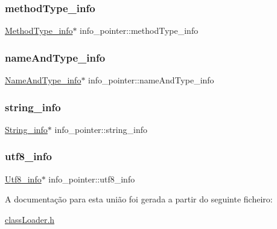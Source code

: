 \subsubsection{\texorpdfstring{method\+Type\+\_\+info}{methodType\_info}}
{\footnotesize\ttfamily \hyperlink{struct_method_type__info}{Method\+Type\+\_\+info}$\ast$ info\+\_\+pointer\+::method\+Type\+\_\+info}

\mbox{\label{unioninfo__pointer_a6fecafb432eea68dd658b66c527b2604}} 
\subsubsection{\texorpdfstring{name\+And\+Type\+\_\+info}{nameAndType\_info}}
{\footnotesize\ttfamily \hyperlink{struct_name_and_type__info}{Name\+And\+Type\+\_\+info}$\ast$ info\+\_\+pointer\+::name\+And\+Type\+\_\+info}

\mbox{\label{unioninfo__pointer_ab42897bc57d173f34b4ffc004dc0c9bf}} 
\subsubsection{\texorpdfstring{string\+\_\+info}{string\_info}}
{\footnotesize\ttfamily \hyperlink{struct_string__info}{String\+\_\+info}$\ast$ info\+\_\+pointer\+::string\+\_\+info}

\mbox{\label{unioninfo__pointer_a7a08700f711c4dbc7cbfeadb6b8fa4c2}} 
\subsubsection{\texorpdfstring{utf8\+\_\+info}{utf8\_info}}
{\footnotesize\ttfamily \hyperlink{struct_utf8__info}{Utf8\+\_\+info}$\ast$ info\+\_\+pointer\+::utf8\+\_\+info}



A documentação para esta união foi gerada a partir do seguinte ficheiro\+:\begin{DoxyCompactItemize}
\item 
\hyperlink{class_loader_8h}{class\+Loader.\+h}\end{DoxyCompactItemize}
